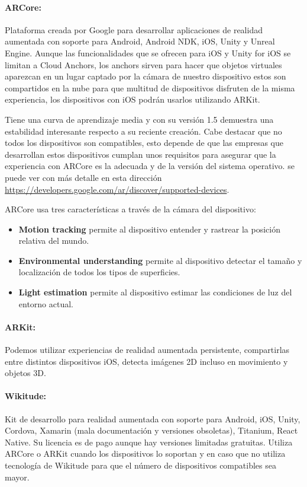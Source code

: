 \paragraph{ARCore:}
Plataforma creada por Google para desarrollar aplicaciones de
 realidad aumentada con soporte para Android, Android NDK, iOS,
 Unity y Unreal Engine. Aunque las funcionalidades que se ofrecen
 para iOS y Unity for iOS se limitan a Cloud Anchors, los anchors
 sirven para hacer que objetos virtuales aparezcan en un lugar
 captado por la cámara de nuestro dispositivo estos son compartidos
 en la nube para que multitud de dispositivos disfruten de la misma
 experiencia, los dispositivos con iOS podrán usarlos utilizando ARKit.

Tiene una curva de aprendizaje media y con su versión 1.5 demuestra una
 estabilidad interesante respecto a su reciente creación. Cabe destacar
 que no todos los dispositivos son compatibles, esto depende de que las
 empresas que desarrollan estos dispositivos cumplan unos requisitos
 para asegurar que la experiencia con ARCore es la adecuada y de la
 versión del sistema operativo. se puede ver con más detalle en esta
 dirección \url{https://developers.google.com/ar/discover/supported-devices}.

ARCore usa tres características a través de la cámara del dispositivo:
 \begin{itemize}  
     \item {\bf Motion tracking} permite al dispositivo entender y rastrear la posición relativa del mundo.
     \item {\bf Environmental understanding} permite al dispositivo detectar el tamaño y localización de todos los tipos de superficies.
     \item {\bf Light estimation} permite al dispositivo estimar las condiciones de luz del entorno actual.
 \end{itemize}

\paragraph{ARKit:}
Podemos utilizar experiencias de realidad aumentada persistente, compartirlas entre distintos dispositivos iOS,
 detecta imágenes 2D incluso en movimiento y objetos 3D.

\paragraph{Wikitude:}
Kit de desarrollo para realidad aumentada con soporte para Android, iOS, Unity, Cordova, Xamarin (mala
 documentación y versiones obsoletas), Titanium, React Native.
Su licencia es de pago aunque hay versiones limitadas gratuitas.
Utiliza ARCore o ARKit cuando los dispositivos lo soportan y en caso que no utiliza tecnología de Wikitude
 para que el número de dispositivos compatibles sea mayor. 

